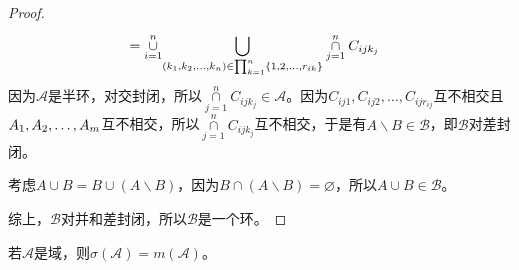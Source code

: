 \begin{proof}
\begin{align*}
		&=\underset{i=1}{\overset{n}{\cup}}\underset{(k_1, k_2, \dots, k_{n})\in\prod_{k=1}^{n}\{1,2,\dots,r_{ik}\}}{\overset{}{\bigcup}}\underset{j=1}{\overset{n}{\cap}}C_{ijk_j}
	\end{align*}
	因为$\mathscr{A}$是半环，对交封闭，所以$\underset{j=1}{\overset{n}{\cap}}C_{ijk_j}\in \mathscr{A}$。因为$C_{ij1},C_{ij2},\dots,C_{ijr_{ij}}$互不相交且$A_1, A_2, \dots, A_{m}$互不相交，所以$\underset{j=1}{\overset{n}{\cap}}C_{ijk_j}$互不相交，于是有$A\backslash B\in \mathscr{B}$，即$\mathscr{B}$对差封闭。\par
	考虑$A\cup B=B\cup(A\backslash B)$，因为$B\cap (A\backslash B)=\varnothing$，所以$A\cup B\in \mathscr{B}$。\par
	综上，$\mathscr{B}$对并和差封闭，所以$\mathscr{B}$是一个环。
\end{proof}
\begin{theorem}\label{theo:SigmaField=MonotoneField}
	若$\mathscr{A}$是域，则$\sigma(\mathscr{A})=m(\mathscr{A})$。
\end{theorem}
